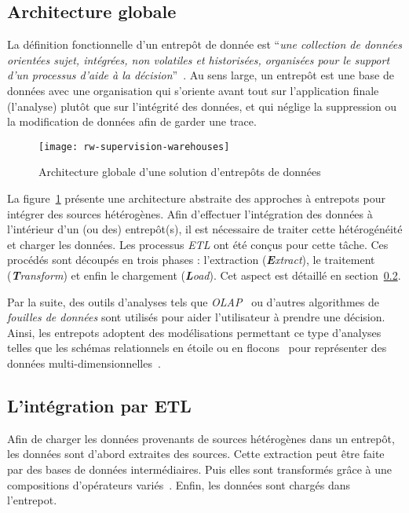 \subsection{Architecture globale}
La définition fonctionnelle d'un entrepôt de donnée est \enquote{\it une collection de données orientées sujet, intégrées, non volatiles et historisées, organisées pour le support d’un processus d’aide à la décision}~\cite{Inmon:warehouse}. Au sens large, un entrepôt est une base de données avec une organisation qui s'oriente avant tout sur l'application finale (l'analyse) plutôt que sur l'intégrité des données, et qui néglige la suppression ou la modification de données afin de garder une trace.
\begin{figure}[ht]
	\centering
	\texttt{[image: rw-supervision-warehouses]}
	\caption{Architecture globale d'une solution d'entrepôts de données}\label{fig:rw:supervision:warehouses}
\end{figure}
La figure~\ref{fig:rw:supervision:warehouses} présente une architecture abstraite des approches à entrepots pour intégrer des sources hétérogènes. Afin d'effectuer l'intégration des données à l'intérieur d'un (ou des) entrepôt(s), il est nécessaire de traiter cette hétérogénéité et charger les données. Les processus \textit{ETL} ont été conçus pour cette tâche. Ces procédés sont découpés en trois phases : l'extraction (\textit{\textbf{E}xtract}), le traitement (\textit{\textbf{T}ransform}) et enfin le chargement (\textit{\textbf{L}oad}). Cet aspect est détaillé en section~\ref{sec:rw:supervision:warehouse:etl}.

Par la suite, des outils d'analyses tels que \textit{OLAP}~\cite{Codd:olap} ou d'autres algorithmes de \textit{fouilles de données} sont utilisés pour aider l'utilisateur à prendre une décision. Ainsi, les entrepots adoptent des modélisations permettant ce type d'analyses telles que les schémas relationnels en étoile ou en flocons~\cite{Levene:snowflake} pour représenter des données multi-dimensionnelles~\cite{Gray:cube}.

\subsection{L'intégration par ETL}\label{sec:rw:supervision:warehouse:etl}
Afin de charger les données provenants de sources hétérogènes dans un entrepôt, les données sont d'abord extraites des sources. Cette extraction peut être faite par des bases de données intermédiaires. Puis elles sont transformés grâce à une compositions d'opérateurs variés~\cite{Vassiliadis:taxonomy}. Enfin, les données sont chargés dans l'entrepot.


